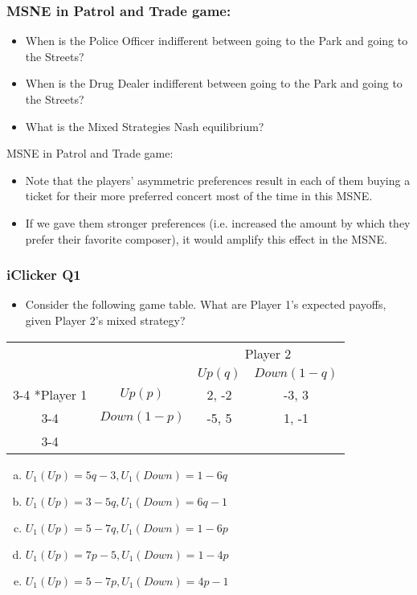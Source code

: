 \begin{frame}
\frametitle{MSNE in Patrol and Trade game:}
\begin{itemize}
\item When is the Police Officer indifferent between going to the Park and going to the Streets?
  \vspace{15mm}

\item When is the Drug Dealer indifferent between going to the Park and going to the Streets?
  \vspace{15mm}

  \item What is the \alert{Mixed Strategies Nash equilibrium?}
  \vspace{15mm}

\end{itemize}
\end{frame}

\begin{frame}{MSNE in Patrol and Trade game:}
\begin{itemize}
\item Note that the players' asymmetric preferences result in each of them buying a ticket for their more preferred concert most of the time in this MSNE.
\item If we gave them stronger preferences (i.e. increased the amount by which they prefer their favorite composer), it would amplify this effect in the MSNE.
\end{itemize}
\end{frame}

\begin{frame}
\frametitle{iClicker Q1}
\begin{itemize}
\item Consider the following game table. What are Player 1's expected payoffs, given Player 2's mixed strategy?
\end{itemize}
\begin{table}[h]
\centering
\begin{tabular}{cc|c|c|}
	& \multicolumn{1}{c}{} & \multicolumn{2}{c}{Player 2}\\
	& \multicolumn{1}{c}{} & \multicolumn{1}{c}{$Up (q)$}  & \multicolumn{1}{c}{$Down (1 - q)$} \\\cline{3-4}
	\multirow{2}*{Player 1}  & $Up (p)$ & 2, -2 & -3, 3 \\\cline{3-4}
	& $Down (1 - p)$ & -5, 5 & 1, -1 \\\cline{3-4}
\end{tabular}
\end{table}
  \begin{enumerate}[(a)]
\item $U_1(Up) = 5q - 3, U_1(Down) = 1 - 6q$
\item $U_1(Up) = 3 - 5q, U_1(Down) = 6q - 1$
\item $U_1(Up) = 5 - 7q, U_1(Down) = 1 - 6p$
\item $U_1(Up) = 7p - 5, U_1(Down) = 1 - 4p$
\item $U_1(Up) = 5 - 7p, U_1(Down) = 4p - 1$
\end{enumerate}
\end{frame}

